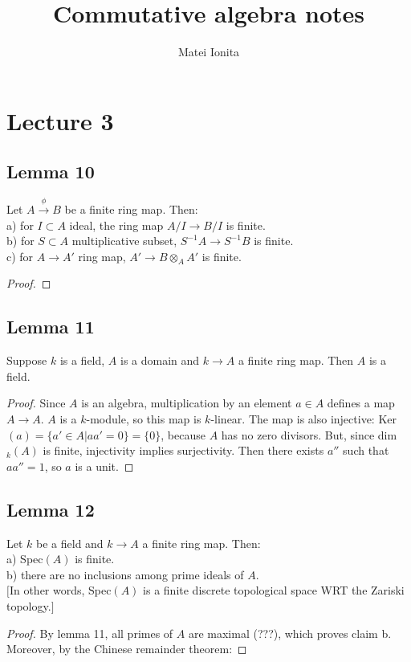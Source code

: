 \documentclass[12 pt]{article}
\title{Commutative algebra notes}
\author{Matei Ionita}
\begin{document}
  \maketitle

\section*{Lecture 3}

\subsection*{Lemma 10}
Let $A \overset{\phi}{\to} B$ be a finite ring map. Then:
\\
a) for $I \subset A$ ideal, the ring map $A/I \to B/I$ is finite.
\\
b) for $S\subset A$ multiplicative subset, $S^{-1}A \to S^{-1}B$ is finite.
\\
c) for $A\to A'$ ring map, $A' \to B \otimes_A A'$ is finite.
 \begin{proof}
\end{proof}

\subsection*{Lemma 11}
Suppose $k$ is a field, $A$ is a domain and $k \to A$ a finite ring map. Then $A$ is a field.
\begin{proof}
Since $A$ is an algebra, multiplication by an element $a\in A$ defines a map $A\to A$. $A$ is a $k$-module, so this map is $k$-linear. The map is also injective: Ker$(a) = \{ a' \in A | aa' = 0 \} = \{ 0 \}$, because $A$ has no zero divisors. But, since dim$_k (A)$ is finite, injectivity implies surjectivity. Then there exists $a''$ such that $aa'' = 1$, so $a$ is a unit.
\end{proof}

\subsection*{Lemma 12}
Let $k$ be a field and $k\to A$ a finite ring map. Then:
\\
a) Spec$(A)$ is finite.
\\
b) there are no inclusions among prime ideals of $A$.
\\
$[$In other words, Spec$(A)$ is a finite discrete topological space WRT the Zariski topology.$]$
\begin{proof}
By lemma 11, all primes of $A$ are maximal (???), which proves claim b. Moreover, by the Chinese remainder theorem:
\end{proof}
\end{document}
